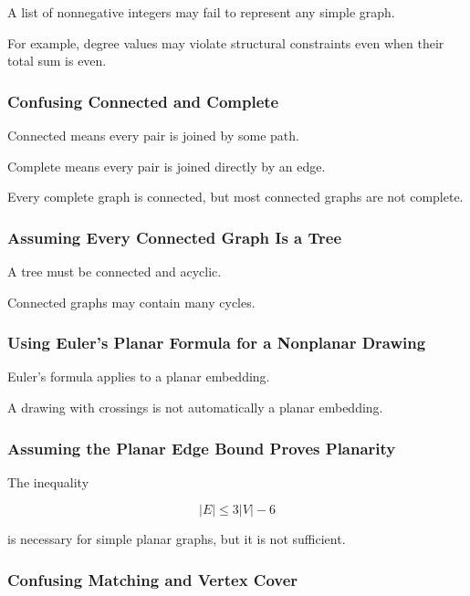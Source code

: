 A list of nonnegative integers may fail to represent any simple graph.

For example, degree values may violate structural constraints even when
their total sum is even.

\subsubsection{Confusing Connected and Complete}

Connected means every pair is joined by some path.

Complete means every pair is joined directly by an edge.

Every complete graph is connected, but most connected graphs are not
complete.

\subsubsection{Assuming Every Connected Graph Is a Tree}

A tree must be connected and acyclic.

Connected graphs may contain many cycles.

\subsubsection{Using Euler's Planar Formula for a Nonplanar Drawing}

Euler's formula applies to a planar embedding.

A drawing with crossings is not automatically a planar embedding.

\subsubsection{Assuming the Planar Edge Bound Proves Planarity}

The inequality

\[
|E|\leq3|V|-6
\]

is necessary for simple planar graphs, but it is not sufficient.

\subsubsection{Confusing Matching and Vertex Cover}

